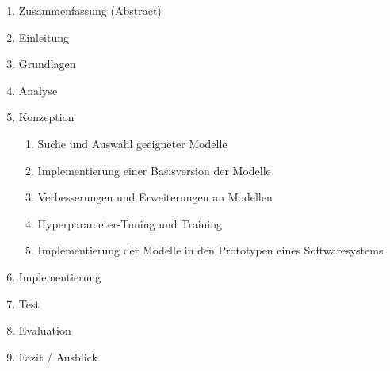 \begin{enumerate}
	\item Zusammenfassung (Abstract)
	\item Einleitung
	\item Grundlagen
	\item Analyse
	\item Konzeption
	\begin{enumerate}[label*=\arabic*.]
		\item Suche und Auswahl geeigneter Modelle
		\item Implementierung einer Basisversion der Modelle
		\item Verbesserungen und Erweiterungen an Modellen
		\item Hyperparameter-Tuning und Training
		\item Implementierung der Modelle in den Prototypen eines Softwaresystems
	\end{enumerate}
	\item Implementierung
	\item Test
	\item Evaluation
	\item Fazit / Ausblick
\end{enumerate}

\pagebreak


\printbibliography[heading=bibintoc, filter=scientific, title={Literaturangaben}]


